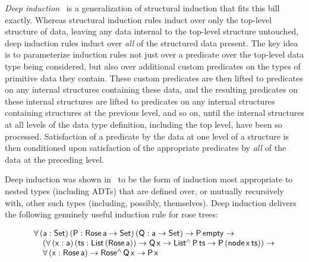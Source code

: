 \documentclass[9pt]{entcs}
\begin{document}
\pagebreak

{\em Deep induction}~\cite{jp20} is a generalization of structural
induction that fits this bill exactly. Whereas structural induction
rules induct over only the top-level structure of data, leaving any
data internal to the top-level structure untouched, deep induction
rules induct over {\em all} of the structured data present. The key
idea is to parameterize induction rules not just over a predicate over
the top-level data type being considered, but also over additional
custom predicates on the types of primitive data they contain. These
custom predicates are then lifted to predicates on any internal
structures containing these data, and the resulting predicates on
these internal structures are lifted to predicates on any internal
structures containing structures at the previous level, and so on,
until the internal structures at all levels of the data type
definition, including the top level, have been so
processed. Satisfaction of a predicate by the data at one level of a
structure is then conditioned upon satisfaction of the appropriate
predicates by {\em all} of the data at the preceding level.

Deep induction was shown in~\cite{jp20} to be the form of induction
most appropriate to nested types (including ADTs) that are defined
over, or mutually recursively with, other such types (including,
possibly, themselves). Deep induction delivers the following genuinely
useful induction rule for rose trees:

\vspace*{-0.075in}

\begin{equation}\label{eq:rose}
\begin{array}{l}
\mathsf{\forall \,(a : Set)\,(P : Rose\,a \to Set)\,(Q : a \to Set)
  \to P\,empty \to}\\ 
\mathsf{\hspace*{0.15in}(\forall \,(x : a)\, (ts :
  List\,(Rose\,a))\to Q\,x \to List^\land\,P\,ts \to P\,(node\,x\,ts)) \to}\\
\mathsf{\hspace*{0.15in}\forall \,(x :
  Rose\,a) \to Rose^\land\,Q\, x \to P\,x} 
\end{array}
\end{equation}
\end{document}
